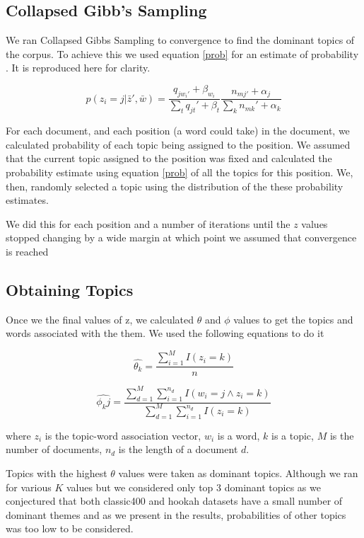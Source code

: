 \documentclass[11pt,a4paper,oneside]{article}
\begin{document}
\subsection{Collapsed Gibb's Sampling}
We ran Collapsed Gibbs Sampling to convergence to find the dominant topics of the corpus. To achieve this we used equation \ref{prob} for an estimate of probability \cite{classNotes}. It is reproduced here for clarity.

\begin{equation}
p(z_i = j | \bar{z}', \bar{w}) = \frac{q_{j w_{i}'} + \beta_{w_i}}{\sum_t{q_{jt}' + \beta_t}}\frac{n_{mj'} + \alpha_j}{\sum_k{n_{mk}' + \alpha_k}}
\end{equation}

For each document, and each position (a word could take) in the document, we calculated probability of each topic being assigned to the position. We assumed that the current topic assigned to the position was fixed and calculated the probability estimate using equation \ref{prob} of all the topics for this position. We, then, randomly selected a topic using the distribution of the these probability estimates.

We did this for each position and a number of iterations until the $z$ values stopped changing by a wide margin at which point we assumed that convergence is reached

\subsection{Obtaining Topics}
Once we the final values of z, we calculated $\theta$ and $\phi$ values to get the topics and words associated with the them. We used the following equations \cite{classNotes} to do it

\begin{equation}
\hat{\theta_k} = \frac{\sum^M_{i=1}{I(z_i=k)}}{n}
\end{equation}

\begin{equation}
\hat{\phi_kj} = \frac{\sum^M_{d=1}{\sum^{n_d}_{i=1}{I(w_i=j \land z_i = k)}}}{\sum^M_{d=1}{\sum^{n_d}_{i=1}{I(z_i = k)}}}
\end{equation}

where $z_i$ is the topic-word association vector, $w_i$ is  a word, $k$ is a topic, $M$ is the number of documents, $n_d$ is the length of a document $d$.

Topics with the highest $\theta$ values were taken as dominant topics. Although we ran for various $K$ values but we considered only top 3 dominant topics as we conjectured that both classic400 and hookah datasets have a small number of dominant themes and as we present in the results, probabilities of other topics was too low to be considered.
\end{document}
